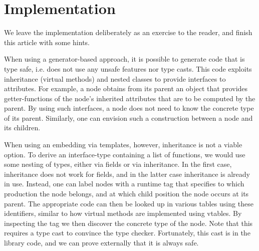 \documentclass{llncs}
\begin{document}
\section{Implementation}
\label{sec:implementation}

  We leave the implementation deliberately as an exercise
  to the reader, and finish this article with some hints.

  When using a generator-based approach, it is possible to
  generate code that is type safe, i.e. does not use any
  unsafe features nor type casts. This code exploits
  inheritance (virtual methods) and nested classes to provide interfaces
  to attributes. For example, a node obtains from its
  parent an object that provides getter-functions of
  the node's inherited attributes that are to be computed
  by the parent. By using such interfaces, a node does
  not need to know the concrete type of its parent.
  Similarly, one can envision such a construction between
  a node and its children.
  
  When using an embedding via templates, however,
  inheritance is not a viable option. To derive an interface-type containing
  a list of functions, we would use some nesting of
  types, either via fields or via inheritance. In the
  first case, inheritance does not work for fields,
  and in the latter case inheritance is already in use.
  Instead, one can label nodes with a runtime tag that
  specifies to which production the node belongs, and
  at which child position the node occurs at its parent.
  The appropriate code can then be looked up in various
  tables using these identifiers, similar to how
  virtual methods are implemented using vtables.
  By inspecting the tag we then discover the concrete type
  of the node. Note that this requires a type cast to
  convince the type checker. Fortunately, this cast is
  in the library code, and we can prove externally that
  it is always safe.



\end{document}
